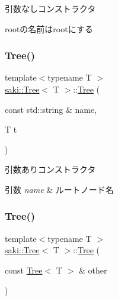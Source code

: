 引数なしコンストラクタ 

rootの名前はrootにする \mbox{\label{classsaki_1_1_tree_a3b755ca793a3e3c9dd6e0aee77bf7bd6}} 
\subsubsection{\texorpdfstring{Tree()}{Tree()}\hspace{0.1cm}{\footnotesize\ttfamily [2/4]}}
{\footnotesize\ttfamily template$<$typename T $>$ \\
\mbox{\hyperlink{classsaki_1_1_tree}{saki\+::\+Tree}}$<$ T $>$\+::\mbox{\hyperlink{classsaki_1_1_tree}{Tree}} (\begin{DoxyParamCaption}\item[{const std\+::string \&}]{name,  }\item[{T}]{t }\end{DoxyParamCaption})\hspace{0.3cm}{\ttfamily [inline]}}



引数ありコンストラクタ 


\begin{DoxyParams}{引数}
{\em name} & ルートノード名 \\
\hline
\end{DoxyParams}
\mbox{\label{classsaki_1_1_tree_a3716d7484b92161bbb38c362280358c0}} 
\subsubsection{\texorpdfstring{Tree()}{Tree()}\hspace{0.1cm}{\footnotesize\ttfamily [3/4]}}
{\footnotesize\ttfamily template$<$typename T $>$ \\
\mbox{\hyperlink{classsaki_1_1_tree}{saki\+::\+Tree}}$<$ T $>$\+::\mbox{\hyperlink{classsaki_1_1_tree}{Tree}} (\begin{DoxyParamCaption}\item[{const \mbox{\hyperlink{classsaki_1_1_tree}{Tree}}$<$ T $>$ \&}]{other }\end{DoxyParamCaption})\hspace{0.3cm}{\ttfamily [inline]}}




